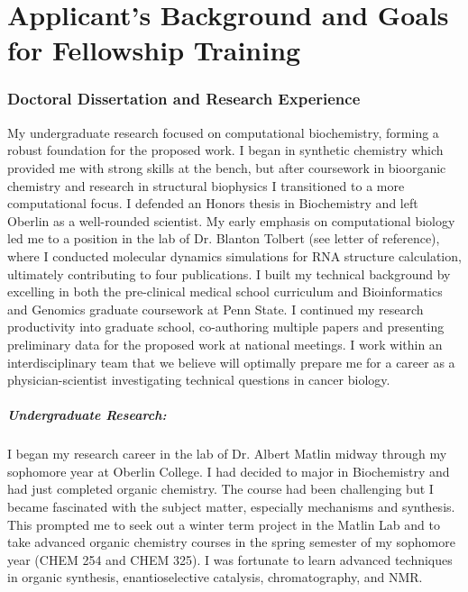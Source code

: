 \documentclass{NIHGrant}
\begin{document}
\part*{Applicant's Background and Goals for Fellowship Training}
\section*{Doctoral Dissertation and Research Experience}
My undergraduate research focused on computational biochemistry, forming a robust foundation for the proposed work. I began in synthetic chemistry which provided me with strong skills at the bench, but after coursework in bioorganic chemistry and research in structural biophysics I transitioned to a more computational focus. I defended an Honors thesis in Biochemistry and left Oberlin as a well-rounded scientist. My early emphasis on computational biology led me to a position in the lab of Dr. Blanton Tolbert (see letter of reference), where I conducted molecular dynamics simulations for RNA structure calculation, ultimately contributing to four publications. I built my technical background by excelling in both the pre-clinical medical school curriculum and Bioinformatics and Genomics graduate coursework at Penn State. I continued my research productivity into graduate school, co-authoring multiple papers and presenting preliminary data for the proposed work at national meetings. I work within an interdisciplinary team that we believe will optimally prepare me for a career as a physician-scientist investigating technical questions in cancer biology.

\subsubsection*{Undergraduate Research:}
I began my research career in the lab of Dr. Albert Matlin midway through my sophomore year at Oberlin College. I had decided to major in Biochemistry and had just completed organic chemistry. The course had been challenging but I became fascinated with the subject matter, especially mechanisms and synthesis. This prompted me to seek out a winter term project in the Matlin Lab and to take advanced organic chemistry courses in the spring semester of my sophomore year (CHEM 254 and CHEM 325). I was fortunate to learn advanced techniques in organic synthesis, enantioselective catalysis, chromatography, and NMR.
\end{document}
